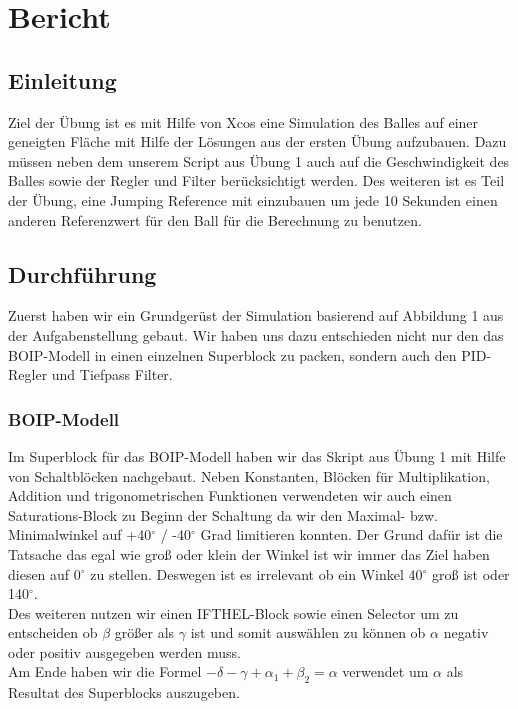 \section{Bericht}

\subsection{Einleitung}
Ziel der Übung ist es mit Hilfe von Xcos eine Simulation des Balles auf einer geneigten Fläche mit Hilfe der Lösungen aus der ersten Übung aufzubauen. Dazu müssen neben dem unserem Script aus Übung 1 auch auf die Geschwindigkeit des Balles sowie der Regler und Filter  berücksichtigt werden. Des weiteren ist es Teil der Übung, eine Jumping Reference mit einzubauen um jede 10 Sekunden einen anderen Referenzwert für den Ball für die Berechnung zu benutzen.

\subsection{Durchführung}
Zuerst haben wir ein Grundgerüst der Simulation basierend auf Abbildung 1 aus der Aufgabenstellung gebaut. Wir haben uns dazu entschieden nicht nur den das BOIP-Modell in einen einzelnen Superblock zu packen, sondern auch den PID-Regler und Tiefpass Filter.

\subsubsection{BOIP-Modell}
Im Superblock für das BOIP-Modell haben wir das Skript aus Übung 1 mit Hilfe von Schaltblöcken nachgebaut. Neben Konstanten, Blöcken für Multiplikation, Addition und trigonometrischen Funktionen verwendeten wir auch einen Saturations-Block zu Beginn der Schaltung da wir den Maximal- bzw. Minimalwinkel auf +40$^\circ$ / -40$^\circ$ Grad limitieren konnten. Der Grund dafür ist die Tatsache das egal wie groß oder klein der Winkel ist wir immer das Ziel haben diesen auf 0$^\circ$ zu stellen. Deswegen ist es irrelevant ob ein Winkel 40$^\circ$ groß ist oder 140$^\circ$. \\
Des weiteren nutzen wir einen IFTHEL-Block sowie einen Selector um zu entscheiden ob $\beta$ größer als $\gamma$ ist und somit auswählen zu können ob $\alpha$ negativ oder positiv ausgegeben werden muss. \\
Am Ende haben wir die Formel $ - \delta - \gamma + \alpha_1 + \beta_2 = \alpha $ verwendet um $\alpha$ als Resultat des Superblocks auszugeben.

